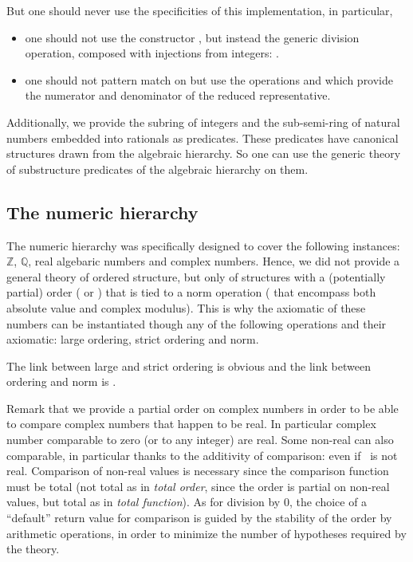 But one should never use the specificities of this implementation, in
particular,
\begin{itemize}
\item one should not use the constructor , but instead the
  generic division operation, composed with injections from integers:
  .
\item one should not pattern match on  but use the operations
   and  which provide the numerator and denominator of
  the reduced representative.
\end{itemize}

Additionally, we provide the subring of integers  and the
sub-semi-ring of natural numbers  embedded into rationals as
predicates. These predicates have canonical structures drawn from the
algebraic hierarchy. So one can use the generic theory of substructure
predicates of the algebraic hierarchy on them.


\subsection{The numeric hierarchy}
\label{sec:numeric-hierarchy}

The numeric hierarchy was specifically designed to cover the following
instances: $\mathbb{Z}$, $\mathbb{Q}$, real algebaric numbers and
complex numbers. Hence, we did not provide a general theory of ordered
structure, but only of structures with a (potentially partial) order
(\C{_ <= _} or \C{_ < _}) that is tied to a norm operation (
that encompass both absolute value and complex modulus). This is why
the axiomatic of these numbers can be instantiated though any of the
following operations and their axiomatic: large ordering, strict
ordering and norm.

The link between large and strict ordering is obvious and the link
between ordering and norm is .

Remark that we provide a partial order on complex numbers in order to
be able to compare complex numbers that happen to be real. In
particular complex number comparable to zero (or to any integer) are
real. Some non-real can also comparable, in particular thanks to the
additivity of comparison:  even if~ is
not real. Comparison of non-real values is necessary since the
comparison function must be total (not total as in \emph{total order},
since the order is partial on non-real values, but total as in
\emph{total function}). As for division by $0$, the choice of a
``default'' return value for comparison is guided by the stability of
the order by arithmetic operations, in order to minimize the number of
hypotheses required by the theory.

